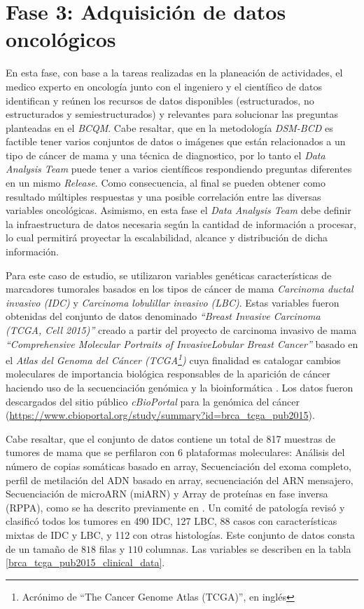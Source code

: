 \section{Fase 3: Adquisición de datos oncológicos}
En esta fase, con base a la tareas realizadas en la planeación de actividades, el medico experto en oncología junto con el ingeniero y el científico de datos identifican y reúnen los recursos de datos disponibles (estructurados, no estructurados y semiestructurados) y relevantes para solucionar las preguntas planteadas en el \textit{BCQM}. Cabe resaltar, que en la metodología \textit{\textit{DSM-BCD}} es factible tener varios conjuntos de datos o imágenes que están relacionados a un tipo de cáncer de mama y una técnica de diagnostico, por lo tanto  el \textit{Data Analysis Team} puede tener a varios científicos respondiendo preguntas diferentes en un mismo \textit{Release}. Como consecuencia, al final se pueden obtener como resultado múltiples respuestas y una posible correlación entre las diversas variables oncológicas.  Asimismo, en esta fase el \textit{Data Analysis Team} debe definir la infraestructura de datos necesaria según la cantidad de información a procesar, lo cual permitirá proyectar la escalabilidad, alcance y distribución de dicha información. 

Para este caso de estudio, se utilizaron variables genéticas características de marcadores tumorales  basados en los tipos de cáncer de mama  \textit{Carcinoma ductal invasivo (IDC)} y \textit{Carcinoma lobulillar invasivo (LBC)}. Estas variables fueron obtenidas del conjunto de datos denominado \textit{“Breast Invasive Carcinoma (TCGA, Cell 2015)”} creado a partir del proyecto de carcinoma invasivo de mama \textit{“Comprehensive Molecular Portraits of InvasiveLobular Breast Cancer”} \cite{Ciriello2015} basado en el \textit {Atlas del Genoma del Cáncer (TCGA\footnote{Acrónimo de “The Cancer Genome Atlas (TCGA)”, en inglés })} cuya finalidad es catalogar cambios moleculares de importancia biológica responsables de la aparición de cáncer haciendo uso de la secuenciación genómica y la bioinformática \cite{TCGA2023}. Los datos fueron descargados del sitio público \textit{cBioPortal} para la genómica del cáncer  (\url{https://www.cbioportal.org/study/summary?id=brca_tcga_pub2015}). 

Cabe resaltar, que el conjunto de datos contiene un total de 817 muestras de tumores de mama que  se perfilaron con 6 plataformas moleculares: Análisis del número de copias somáticas basado en array, Secuenciación del exoma completo, perfil de metilación del ADN basado en array, secuenciación del ARN mensajero, Secuenciación de microARN (miARN) y Array de proteínas en fase inversa (RPPA), como se ha descrito previamente en \cite{Bass2014}. Un comité de patología revisó y clasificó todos los tumores en 490 IDC, 127 LBC, 88 casos con características mixtas de IDC y LBC, y 112 con otras histologías. Este conjunto de datos consta de un tamaño de $818$ filas y $110$ columnas. Las variables se describen en la tabla \ref{brca_tcga_pub2015_clinical_data}. 

